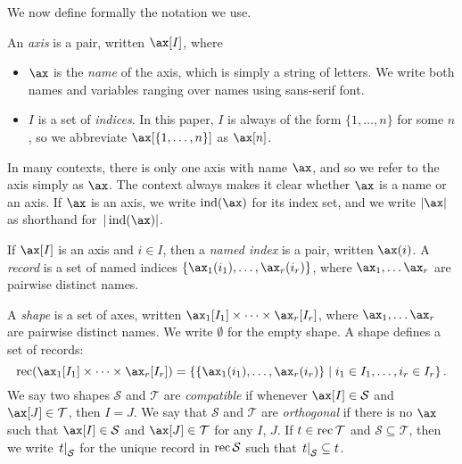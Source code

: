 We now define formally the notation we use.

\begin{definition}
An \emph{axis} is a pair, written $\ax[I]$, where
\begin{itemize}
\item $\ax$ is the \emph{name} of the axis, which is simply a string of letters.
We write both names and variables ranging over names using sans-serif font.
\item $I$ is a set of \emph{indices}. In this paper, $I$ is always of the form $\{1, \ldots, n\}$ for some $n$, so we abbreviate $\ax[\{1, \ldots, n\}]$ as $\ax[n]$.
\end{itemize}
In many contexts, there is only one axis with name $\ax$, and so we refer to the axis simply as $\ax$. The context always makes it clear whether $\ax$ is a name or an axis. If $\ax$ is an axis, we write $\ind(\ax)$ for its index set, and we write $|\ax|$ as shorthand for~$|\ind(\ax)|$.
\end{definition}

\begin{definition}
If $\ax[I]$ is an axis and $i\in I$, then a \emph{named index} is a pair, written $\ax(i)$. 
A \emph{record} is a set of named indices $\{\ax_1(i_1), \ldots, \ax_r(i_r)\}$, where $\ax_1, \ldots \ax_r$ are pairwise distinct names. 
\end{definition}

\begin{definition}[Shapes]
A \emph{shape} is a set of axes, written $\ax_1[I_1] \times \cdots \times \ax_r[I_r]$, where $\ax_1, \ldots \ax_r$ are pairwise distinct names. We write $\emptyset$ for the empty shape. A shape defines a set of records:
\begin{equation*}
\rec (\ax_1[I_1] \times \cdots \times \ax_r[I_r]) = \left\{\{\ax_1(i_1), \ldots, \ax_r(i_r)\} \mid i_1 \in I_1, \ldots, i_r \in I_r\right\}.
\end{equation*}
%
We say two shapes $\mathcal{S}$ and $\mathcal{T}$ are \emph{compatible} if whenever $\ax[I] \in \mathcal{S}$ and $\ax[J] \in \mathcal{T}$, then $I = J$. We say that $\mathcal{S}$ and $\mathcal{T}$ are \emph{orthogonal} if there is no $\ax$ such that $\ax[I] \in \mathcal{S}$ and $\ax[J] \in \mathcal{T}$ for any $I$, $J$.
%
If $t \in \operatorname{rec} \mathcal{T}$ and $\mathcal{S} \subseteq \mathcal{T}$, then we write $\mathopen{}\left.t\right|_{\mathcal{S}}$ for the unique record in $\operatorname{rec} \mathcal{S}$ such that $\mathopen{}\left.t\right|_{\mathcal{S}} \subseteq t$.
\end{definition}

